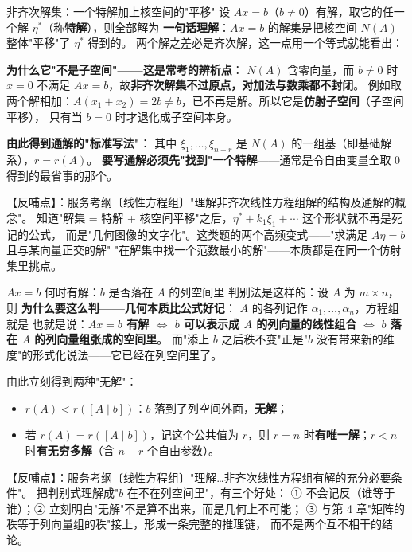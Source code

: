 \begin{fdeep}{非齐次解集：一个特解加上核空间的"平移"}
设 $Ax=b$（$b\ne0$）有解，取它的任一个解 $\eta^{*}$（称\textbf{特解}），则全部解为
\textbf{一句话理解}：$Ax=b$ 的解集是把核空间 $N(A)$ 整体"平移"了 $\eta^{*}$ 得到的。
两个解之差必是齐次解，这一点用一个等式就能看出：

\textbf{为什么它"不是子空间"——这是常考的辨析点}：
$N(A)$ 含零向量，而 $b\ne0$ 时 $x=0$ 不满足 $Ax=b$，故\textbf{非齐次解集不过原点，对加法与数乘都不封闭}。
例如取两个解相加：$A(x_1+x_2)=2b\ne b$，已不再是解。所以它是\textbf{仿射子空间}（子空间平移），
只有当 $b=0$ 时才退化成子空间本身。

\medskip
\textbf{由此得到通解的"标准写法"}：
其中 $\xi_1,\dots,\xi_{n-r}$ 是 $N(A)$ 的一组基（即基础解系），$r=r(A)$。
\textbf{要写通解必须先"找到"一个特解}——通常是令自由变量全取 $0$ 得到的最省事的那个。

【反哺点】：服务考纲〔线性方程组〕"理解非齐次线性方程组解的结构及通解的概念"。
知道"解集 = 特解 + 核空间平移"之后，$\eta^{*}+k_1\xi_1+\cdots$ 这个形状就不再是死记的公式，
而是"几何图像的文字化"。这类题的两个高频变式——"求满足 $A\eta=b$ 且与某向量正交的解"
"在解集中找一个范数最小的解"——本质都是在同一个仿射集里挑点。
\end{fdeep}

\begin{fdeep}{$A x=b$ 何时有解：$b$ 是否落在 $A$ 的列空间里}
判别法是这样的：设 $A$ 为 $m\times n$，则
\textbf{为什么要这么判——几何本质比公式好记}：
$A$ 的各列记作 $\alpha_1,\dots,\alpha_n$，方程组就是
也就是说：\textbf{$Ax=b$ 有解 $\iff$ $b$ 可以表示成 $A$ 的列向量的线性组合}
$\iff$ \textbf{$b$ 落在 $A$ 的列向量组张成的空间里}。
而"添上 $b$ 之后秩不变"正是"$b$ 没有带来新的维度"的形式化说法——它已经在列空间里了。

由此立刻得到两种"无解"：
\begin{itemize}[leftmargin=2.2em,itemsep=0.25em]
\item $r(A)<r([A\mid b])$：$b$ 落到了列空间外面，\textbf{无解}；
\item 若 $r(A)=r([A\mid b])$，记这个公共值为 $r$，则 $r=n$ 时\textbf{有唯一解}；$r<n$ 时\textbf{有无穷多解}（含 $n-r$ 个自由参数）。
\end{itemize}

【反哺点】：服务考纲〔线性方程组〕"理解…非齐次线性方程组有解的充分必要条件"。
把判别式理解成"$b$ 在不在列空间里"，有三个好处：
① 不会记反（谁等于谁）；② 立刻明白"无解"不是算不出来，而是几何上不可能；
③ 与第 4 章"矩阵的秩等于列向量组的秩"接上，形成一条完整的推理链，
而不是两个互不相干的结论。
\end{fdeep}
